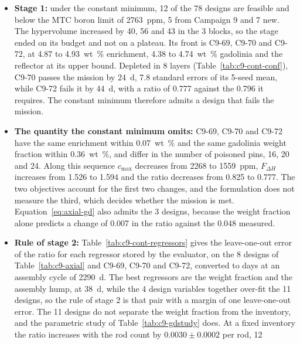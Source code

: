 \begin{itemize}
  \item \textbf{Stage 1:} under the constant minimum, 12 of the 78
        designs are feasible and below the MTC boron limit of
        \SI{2763}{ppm}, 5 from Campaign 9 and 7 new. The hypervolume
        increased by 40, 56 and 43 in the 3 blocks, so the stage ended
        on its budget and not on a plateau. Its front is C9-69, C9-70
        and C9-72, at 4.87 to \SI{4.93}{wt\%} enrichment, 4.38 to
        \SI{4.74}{wt\%} gadolinia and the reflector at its upper bound.
        Depleted in 8 layers (Table~\ref{tab:c9-cont-conf}), C9-70
        passes the mission by \SI{24}{d}, 7.8 standard errors of its
        5-seed mean, while C9-72 fails it by \SI{44}{d}, with a ratio
        of 0.777 against the 0.796 it requires. The constant minimum
        therefore admits a design that fails the mission.
  \item \textbf{The quantity the constant minimum omits:} C9-69, C9-70
        and C9-72 have the same enrichment within \SI{0.07}{wt\%} and
        the same gadolinia weight fraction within \SI{0.36}{wt\%}, and
        differ in the number of poisoned pins, 16, 20 and 24. Along this
        sequence $c_\mathrm{max}$ decreases from 2268 to \SI{1559}{ppm},
        $F_{\Delta H}$ increases from 1.526 to 1.594 and the ratio
        decreases from 0.825 to 0.777. The two objectives account for
        the first two changes, and the formulation does not measure the
        third, which decides whether the mission is met.
        Equation~\eqref{eq:axial-gd} also admits the 3 designs, because
        the weight fraction alone predicts a change of 0.007 in the
        ratio against the 0.048 measured.
  \item \textbf{Rule of stage 2:} Table~\ref{tab:c9-cont-regressors}
        gives the leave-one-out error of the ratio for each regressor
        stored by the evaluator, on the 8 designs of
        Table~\ref{tab:c9-axial} and C9-69, C9-70 and C9-72, converted
        to days at an assembly cycle of \SI{2290}{d}. The best
        regressors are the weight fraction and the assembly hump, at
        \SI{38}{d}, while the 4 design variables together over-fit the
        11 designs, so the rule of stage 2 is that pair with a margin of
        one leave-one-out error. The 11 designs do not separate the
        weight fraction from the inventory, and the parametric study of
        Table~\ref{tab:c9-gdstudy} does. At a fixed inventory the ratio
        increases with the rod count by $0.0030 \pm 0.0002$ per rod, 12

\end{itemize}
